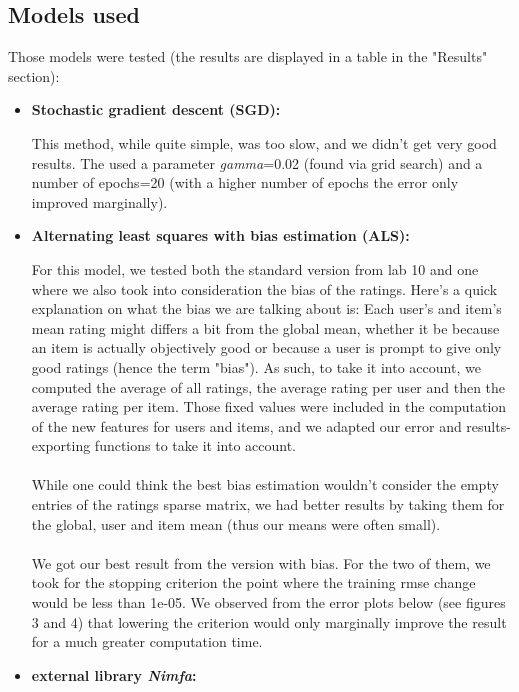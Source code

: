 \documentclass[a4paper]{article}
\begin{document}
\subsection{Models used}
Those models were tested (the results are displayed in a table in the "Results" section):

\begin{itemize}
\item \textbf{Stochastic gradient descent (SGD):}  

This method, while quite simple, was too slow, and we didn't get very good results.
The used a parameter \textit{gamma}=0.02 (found via grid search) and a number of epochs=20 (with a higher number of epochs the error only improved marginally).
\item \textbf{Alternating least squares with bias estimation (ALS):}  

For this model, we tested both the standard version from lab 10 and one where we also took into consideration the bias of the ratings. Here's a quick explanation on what the bias we are talking about is:
Each user's and item's mean rating might differs a bit from the global mean, whether it be because an
item is actually objectively good or because a user is prompt to give only good ratings (hence the
term "bias").
As such, to take it into account, we computed the average of all ratings, the average rating per user
and then the average rating per item.
Those fixed values were included in the computation of the new features for users and items, and we adapted our error and results-exporting functions to take it into account.  
\paragraph{}
While one could think the best bias estimation wouldn't consider the empty entries of the ratings sparse matrix, we had better results by taking them for the global, user and item mean (thus our means were often small).
\paragraph{}
We got our best result from the version with bias. For the two of them, we took for the stopping criterion the point where the training rmse change would be less than 1e-05. We observed from the error plots below (see figures 3 and 4) that lowering the criterion would only marginally improve the result for a much greater computation time. 
\item \textbf{external library \textit{Nimfa}:}  


\end{itemize}
\end{document}
